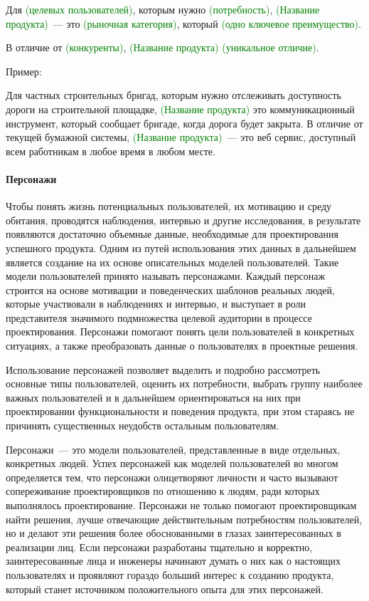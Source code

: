 \documentclass{../../text-style}
\begin{document}
Для \textcolor{green}{(целевых пользователей)}, которым нужно \textcolor{green}{(потребность)}, \textcolor{green}{(Название продукта)}~--- это \textcolor{green}{(рыночная категория)}, который \textcolor{green}{(одно ключевое преимущество)}.

\vspace{5mm}

В отличие от \textcolor{green}{(конкуренты)}, \textcolor{green}{(Название продукта)} \textcolor{green}{(уникальное отличие)}.

Пример:

Для частных строительных бригад, которым нужно отслеживать доступность дороги на строительной площадке, \textcolor{green}{(Название продукта)} это коммуникационный инструмент, который сообщает бригаде, когда дорога будет закрыта. В отличие от текущей бумажной системы, \textcolor{green}{(Название продукта)}~--- это веб сервис, доступный всем работникам в любое время в любом месте.

\paragraph{Персонажи}

Чтобы понять жизнь потенциальных пользователей, их мотивацию и среду обитания, проводятся наблюдения, интервью и другие исследования, в результате появляются достаточно объемные данные, необходимые для проектирования успешного продукта. Одним из путей использования этих данных в дальнейшем является создание на их основе описательных моделей пользователей. Такие модели пользователей принято называть персонажами. Каждый персонаж строится на основе мотивации и поведенческих шаблонов реальных людей, которые участвовали в наблюдениях и интервью, и выступает в роли представителя значимого подмножества целевой аудитории в процессе проектирования. Персонажи помогают понять цели пользователей в конкретных ситуациях, а также преобразовать данные о пользователях в проектные решения.

Использование персонажей позволяет выделить и подробно рассмотреть основные типы пользователей, оценить их потребности, выбрать группу наиболее важных пользователей и в дальнейшем ориентироваться на них при проектировании функциональности и поведения продукта, при этом стараясь не причинять существенных неудобств остальным пользователям.

Персонажи~--- это модели пользователей, представленные в виде отдельных, конкретных людей. Успех персонажей как моделей пользователей во многом определяется тем, что персонажи олицетворяют личности и часто вызывают сопереживание проектировщиков по отношению к людям, ради которых выполнялось проектирование. Персонажи не только помогают проектировщикам найти решения, лучше отвечающие действительным потребностям пользователей, но и делают эти решения более обоснованными в глазах заинтересованных в реализации лиц. Если персонажи разработаны тщательно и корректно, заинтересованные лица и инженеры начинают думать о них как о настоящих пользователях и проявляют гораздо больший интерес к созданию продукта, который станет источником положительного опыта для этих персонажей.
\end{document}
